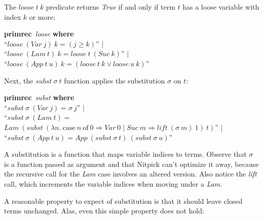\documentclass[a4paper,12pt]{article}
\begin{document}
The $\textit{loose}~t~k$ predicate returns \textit{True} if and only if
term $t$ has a loose variable with index $k$ or more:

\prew
\textbf{primrec}~\textit{loose} \textbf{where} \\
``$\textit{loose}~(\textit{Var}~j)~k = (j \ge k)$'' $\mid$ \\
``$\textit{loose}~(\textit{Lam}~t)~k = \textit{loose}~t~(\textit{Suc}~k)$'' $\mid$ \\
``$\textit{loose}~(\textit{App}~t~u)~k = (\textit{loose}~t~k \mathrel{\lor} \textit{loose}~u~k)$''
\postw

Next, the $\textit{subst}~\sigma~t$ function applies the substitution $\sigma$
on $t$:

\prew
\textbf{primrec}~\textit{subst} \textbf{where} \\
``$\textit{subst}~\sigma~(\textit{Var}~j) = \sigma~j$'' $\mid$ \\
``$\textit{subst}~\sigma~(\textit{Lam}~t) = {}$\phantom{''} \\
\phantom{``}$\textit{Lam}~(\textit{subst}~(\lambda n.\> \textrm{case}~n~\textrm{of}~0 \Rightarrow \textit{Var}~0 \mid \textit{Suc}~m \Rightarrow \textit{lift}~(\sigma~m)~1)~t)$'' $\mid$ \\
``$\textit{subst}~\sigma~(\textit{App}~t~u) = \textit{App}~(\textit{subst}~\sigma~t)~(\textit{subst}~\sigma~u)$''
\postw

A substitution is a function that maps variable indices to terms. Observe that
$\sigma$ is a function passed as argument and that Nitpick can't optimize it
away, because the recursive call for the \textit{Lam} case involves an altered
version. Also notice the \textit{lift} call, which increments the variable
indices when moving under a \textit{Lam}.

A reasonable property to expect of substitution is that it should leave closed
terms unchanged. Alas, even this simple property does not hold:
\end{document}

